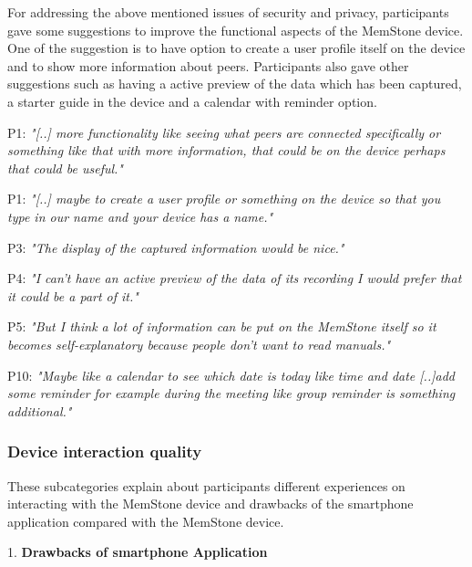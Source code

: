 \documentclass[mscthesis]{usiinfthesis}
\begin{document}
For addressing the above mentioned issues of security and privacy, participants gave some suggestions to improve the functional aspects of the MemStone device. One of the suggestion is to have option to create a user profile itself on the device and to show more information about peers. Participants also gave other suggestions such as having a active preview of the data which has been captured, a starter guide in the device and a calendar with reminder option. 
\newline
\hspace{\parindent}\begin{adjustwidth}{1cm}{1cm}
\hspace{\parindent}P1: \textit{"[..] more functionality like seeing what peers are connected specifically or something like that with more information, that could be on the device perhaps that could be useful."}

P1: \textit{"[..] maybe to create a user profile or something on the device so that you type in our name and your device has a name."}

P3: \textit{"The display of the captured information would be nice."}

P4: \textit{"I can't have an active preview of the data of its recording I would prefer that it could be a part of it."}

P5: \textit{"But I think a lot of information can be put on the MemStone itself so it becomes self-explanatory because people don't want to read manuals."}

P10: \textit{"Maybe like a calendar to see which date is today like time and date [..]add some reminder for example during the meeting like group reminder is something additional."}
\newline
\end{adjustwidth}

\subsubsection*{Device interaction quality}

These subcategories explain about participants different experiences on interacting with the MemStone device and drawbacks of the smartphone application compared with the MemStone device. 

1. \textbf{Drawbacks of smartphone Application}
\end{document}
